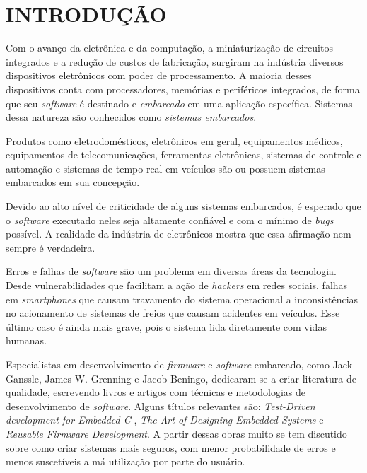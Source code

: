\documentclass[times, twoside, watermark]{artigo}
\begin{document}


\section{INTRODUÇÃO }

Com o avanço da eletrônica e da computação, a miniaturização de circuitos integrados
e a redução de custos de fabricação, surgiram na indústria diversos dispositivos
eletrônicos com poder de processamento. 
A maioria desses dispositivos conta com processadores, memórias e periféricos
integrados, de forma que seu \textit{software} é destinado e \textit{embarcado} 
em uma aplicação específica. Sistemas dessa natureza são conhecidos como
\textit{sistemas embarcados}.

Produtos como eletrodomésticos, eletrônicos em geral, equipamentos médicos,
equipamentos de telecomunicações, ferramentas eletrônicas, sistemas de controle 
e automação e sistemas de tempo real em veículos são ou possuem sistemas embarcados
em sua concepção.

Devido ao alto nível de criticidade de alguns sistemas embarcados, é esperado que o
\textit{software} executado neles seja altamente confiável e com o mínimo de
\textit{bugs} possível. 
A realidade da indústria de eletrônicos mostra que essa afirmação nem sempre é 
verdadeira.

Erros e falhas de \textit{software} são um problema em diversas áreas da tecnologia. 
Desde vulnerabilidades que facilitam a ação de \textit{hackers} em redes sociais,
falhas em \textit{smartphones} que causam travamento do sistema operacional a
inconsistências no acionamento de sistemas de freios que causam acidentes em
veículos. Esse último caso é ainda mais grave, pois o sistema lida diretamente com
vidas humanas. 

Especialistas em desenvolvimento de \textit{firmware} e \textit{software} embarcado, 
como Jack Ganssle, James W. Grenning e Jacob Beningo, dedicaram-se a criar 
literatura de qualidade, escrevendo livros e artigos com técnicas e 
metodologias de desenvolvimento de \textit{software}. 
Alguns títulos relevantes são: \textit{Test-Driven development for Embedded C}
\cite{tddembeddedc}, 
\textit{The Art of Designing Embedded Systems}\cite{ganssle2008art} e
\textit{Reusable Firmware Development}\cite{beningo2017reusable}. 
A partir dessas obras muito se tem discutido sobre como criar sistemas mais seguros, 
com menor probabilidade de erros e menos suscetíveis a má utilização por parte do usuário.
\end{document}
